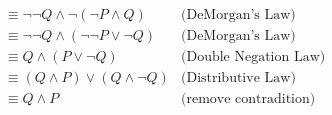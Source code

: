 
\begin{align*}
  &\equiv \lnot\lnot Q \land \lnot(\lnot P \land Q) &\textrm{(DeMorgan's Law)}\\
  &\equiv \lnot\lnot Q \land (\lnot\lnot P \lor \lnot Q) &\textrm{(DeMorgan's
    Law)}\\
  &\equiv Q \land (P \lor \lnot Q) &\textrm{(Double Negation Law)}\\
  &\equiv (Q \land P) \lor (Q \land \lnot Q) &\textrm{(Distributive Law)}\\
  &\equiv Q \land P &\textrm{(remove contradition)}
\end{align*}
